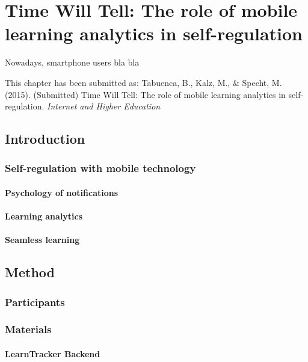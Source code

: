 \chapter{Time Will Tell: The role of mobile learning analytics in self-regulation} 


\vfill
Nowadays, smartphone users bla bla
\vspace{3em}

This chapter has been submitted as: 
Tabuenca, B., Kalz, M., \& Specht, M. (2015). (Submitted) Time Will Tell: The role of mobile learning analytics in self-regulation. \em Internet and Higher Education \em

\clearpage

\section{Introduction}

\subsection{Self-regulation with mobile technology}

\subsubsection{Psychology of notifications}

\subsubsection{Learning analytics}

\subsubsection{Seamless learning}

\section{Method}

\subsection{Participants}

\subsection{Materials}

\subsubsection{LearnTracker Backend}

